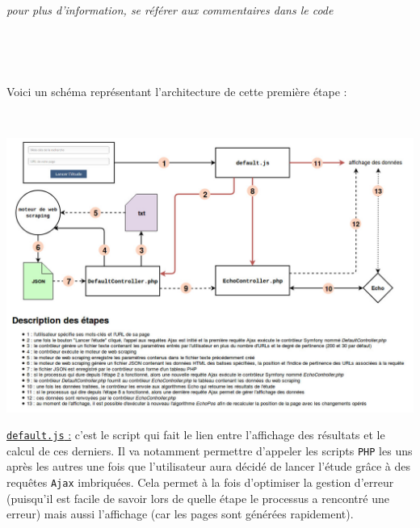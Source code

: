 \documentclass[12pt]{article}
\begin{document}
\textit{pour plus d'information, se référer aux commentaires dans le code}

\

\

Voici un schéma représentant l'architecture de cette première étape :

\

\begin{center}
\includegraphics[scale=0.45]{architectureMachineLearning.jpg}
\end{center}

\newpage
\underline{\texttt{default.js} :} c'est le script qui fait le lien entre l'affichage des résultats et le calcul de ces derniers. Il va notamment permettre d'appeler les scripts \texttt{PHP} les uns après les autres une fois que l'utilisateur aura décidé de lancer l'étude grâce à des requêtes \texttt{Ajax} imbriquées. Cela permet à la fois d'optimiser la gestion d'erreur (puisqu'il est facile de savoir lors de quelle étape le processus a rencontré une erreur) mais aussi l'affichage (car les pages sont générées rapidement).
\end{document}
